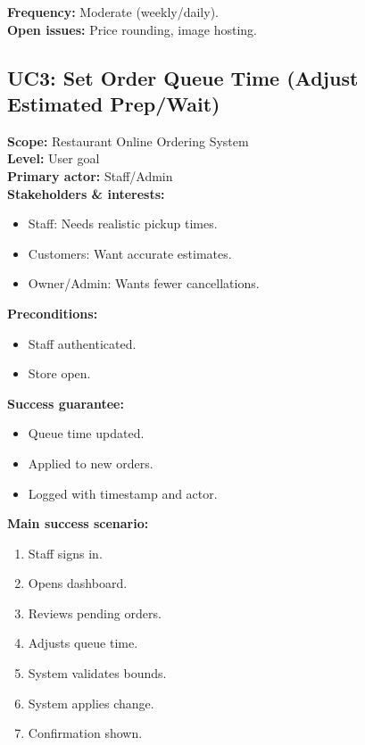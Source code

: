 \documentclass{article}
\begin{document}
\textbf{Frequency:} Moderate (weekly/daily).\\
\textbf{Open issues:} Price rounding, image hosting.

\subsection*{UC3: Set Order Queue Time (Adjust Estimated Prep/Wait)}
\textbf{Scope:} Restaurant Online Ordering System \\
\textbf{Level:} User goal \\
\textbf{Primary actor:} Staff/Admin \\

\textbf{Stakeholders \& interests:}
\begin{itemize}
    \item Staff: Needs realistic pickup times.
    \item Customers: Want accurate estimates.
    \item Owner/Admin: Wants fewer cancellations.
\end{itemize}

\textbf{Preconditions:}
\begin{itemize}
    \item Staff authenticated.
    \item Store open.
\end{itemize}

\textbf{Success guarantee:}
\begin{itemize}
    \item Queue time updated.
    \item Applied to new orders.
    \item Logged with timestamp and actor.
\end{itemize}

\textbf{Main success scenario:}
\begin{enumerate}
    \item Staff signs in.
    \item Opens dashboard.
    \item Reviews pending orders.
    \item Adjusts queue time.
    \item System validates bounds.
    \item System applies change.
    \item Confirmation shown.
\end{enumerate}
\end{document}
